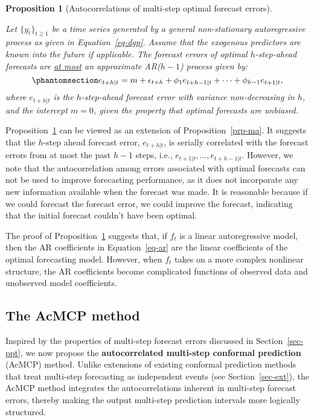 \documentclass[
  11pt,
  a4paper,
]{article}
\theoremstyle{plain}
\newtheorem{proposition}{Proposition}[section]
\theoremstyle{remark}
\begin{document}
\begin{proposition}[Autocorrelations of multi-step optimal forecast
errors]\protect\hypertarget{prp-ar}{}\label{prp-ar}

Let \(\{y_t\}_{t \geq 1}\) be a time series generated by a general
non-stationary autoregressive process as given in Equation~\ref{eq-dgp}.
Assume that the exogenous predictors are known into the future if
applicable. The forecast errors of optimal \(h\)-step-ahead forecasts
are \ul{at most} an approximate AR(\(h-1\)) process given by:
\begin{equation}\phantomsection\label{eq-ar}{
e_{t+h|t} = m + \epsilon_{t+h} + \phi_1e_{t+h-1|t} + \cdots + \phi_{h-1}e_{t+1|t},
}\end{equation} where \(e_{t+h|t}\) is the \(h\)-step-ahead forecast
error with variance non-decreasing in \(h\), and the intercept \(m=0\),
given the property that optimal forecasts are unbiased.

\end{proposition}

Proposition~\ref{prp-ar} can be viewed as an extension of
Proposition~\ref{prp-ma}. It suggests that the \(h\)-step ahead forecast
error, \(e_{t+h|t}\), is serially correlated with the forecast errors
from at most the past \(h-1\) steps, i.e.,
\(e_{t+1|t}, \ldots, e_{t+h-1|t}\). However, we note that the
autocorrelation among errors associated with optimal forecasts can not
be used to improve forecasting performance, as it does not incorporate
any new information available when the forecast was made. It is
reasonable because if we could forecast the forecast error, we could
improve the forecast, indicating that the initial forecast couldn't have
been optimal.

The proof of Proposition~\ref{prp-ar} suggests that, if \(f_t\) is a
linear autoregressive model, then the AR coefficients in
Equation~\ref{eq-ar} are the linear coefficients of the optimal
forecasting model. However, when \(f_t\) takes on a more complex
nonlinear structure, the AR coefficients become complicated functions of
observed data and unobserved model coefficients.

\subsection{The AcMCP method}\label{sec-novel}

Inspired by the properties of multi-step forecast errors discussed in
Section~\ref{sec-ppt}, we now propose the \textbf{autocorrelated
multi-step conformal prediction} (AcMCP) method. Unlike extensions of
existing conformal prediction methods that treat multi-step forecasting
as independent events (see Section~\ref{sec-ext}), the AcMCP method
integrates the autocorrelations inherent in multi-step forecast errors,
thereby making the output multi-step prediction intervals more logically
structured.
\end{document}
